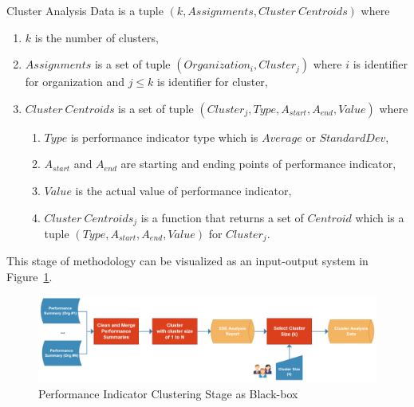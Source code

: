 \theoremstyle{definition}
\begin{definition}
Cluster Analysis Data is a tuple $(k, Assignments, Cluster\ Centroids)$ where
\begin{enumerate}
  \item $k$ is the number of clusters,
  \item $Assignments$ is a set of tuple $(Organization_{i}, Cluster_{j})$ where $i$ is identifier for organization and $j \leq k$ is identifier for cluster,
  \item $Cluster\ Centroids$ is a set of tuple $(Cluster_{j}, Type, A_{start}, A_{end}, Value)$ where
    \begin{enumerate}
      \item $Type$ is performance indicator type which is $Average$ or $StandardDev$,
      \item $A_{start}$ and $A_{end}$ are starting and ending points of performance indicator,
      \item $Value$ is the actual value of performance indicator,
      \item $Cluster\ Centroids_{j}$ is a function that returns a set of $Centroid$ which is a tuple $(Type, A_{start}, A_{end}, Value)$ for $Cluster_{j}$.
    \end{enumerate} 
\end{enumerate}
\end{definition}

This stage of methodology can be visualized as an input-output system in Figure~\ref{fig:performance-indicator-clustering-blackbox}. 
\begin{figure}
  \centering
  \includegraphics[width=\textwidth]{4_methodology/performance-indicator-clustering-blackbox}
  \caption{Performance Indicator Clustering Stage as Black-box }
  \label{fig:performance-indicator-clustering-blackbox}
\end{figure}

